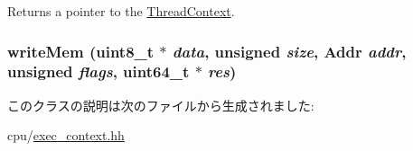 Returns a pointer to the \hyperlink{classThreadContext}{ThreadContext}. \hypertarget{classExecContext_ad46c5edeb1ee9b60445f3e26364e2c5e}{
\subsubsection[{writeMem}]{ writeMem (uint8\_\-t $\ast$ {\em data}, \/  unsigned {\em size}, \/  {\bf Addr} {\em addr}, \/  unsigned {\em flags}, \/  uint64\_\-t $\ast$ {\em res})}}
\label{classExecContext_ad46c5edeb1ee9b60445f3e26364e2c5e}


このクラスの説明は次のファイルから生成されました:\begin{DoxyCompactItemize}
\item 
cpu/\hyperlink{exec__context_8hh}{exec\_\-context.hh}\end{DoxyCompactItemize}
